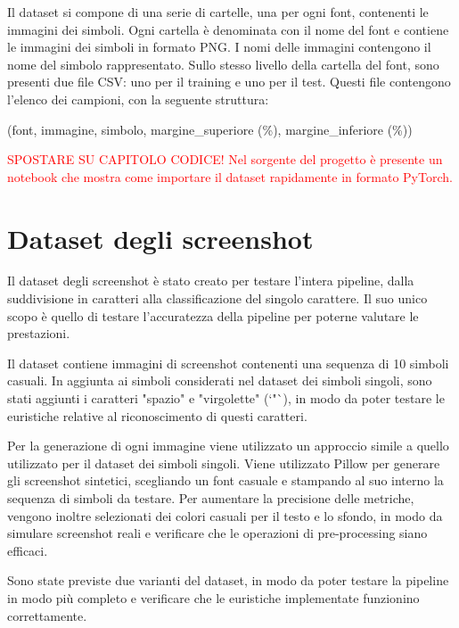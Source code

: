 Il dataset si compone di una serie di cartelle, una per ogni font, contenenti le immagini dei simboli. Ogni cartella è denominata con il nome del font e contiene le immagini dei simboli in formato PNG. I nomi delle immagini contengono il nome del simbolo rappresentato. Sullo stesso livello della cartella del font, sono presenti due file CSV: uno per il training e uno per il test. Questi file contengono l'elenco dei campioni, con la seguente struttura:
\begin{center}
(font, immagine, simbolo, margine\_superiore (\%), margine\_inferiore (\%))
\end{center}

\textcolor{red}{SPOSTARE SU CAPITOLO CODICE! Nel sorgente del progetto è presente un notebook che mostra come importare il dataset rapidamente in formato PyTorch.}

\section{Dataset degli screenshot}
\label{sec:dataset_screenshots}

Il dataset degli screenshot è stato creato per testare l'intera pipeline, dalla suddivisione in caratteri alla classificazione del singolo carattere. Il suo unico scopo è quello di testare l'accuratezza della pipeline per poterne valutare le prestazioni. 

Il dataset contiene immagini di screenshot contenenti una sequenza di 10 simboli casuali. In aggiunta ai simboli considerati nel dataset dei simboli singoli, sono stati aggiunti i caratteri "spazio" e "virgolette" (`"`), in modo da poter testare le euristiche relative al riconoscimento di questi caratteri.

Per la generazione di ogni immagine viene utilizzato un approccio simile a quello utilizzato per il dataset dei simboli singoli. Viene utilizzato Pillow per generare gli screenshot sintetici, scegliando un font casuale e stampando al suo interno la sequenza di simboli da testare.
Per aumentare la precisione delle metriche, vengono inoltre selezionati dei colori casuali per il testo e lo sfondo, in modo da simulare screenshot reali e verificare che le operazioni di pre-processing siano efficaci.

Sono state previste due varianti del dataset, in modo da poter testare la pipeline in modo più completo e verificare che le euristiche implementate funzionino correttamente.

